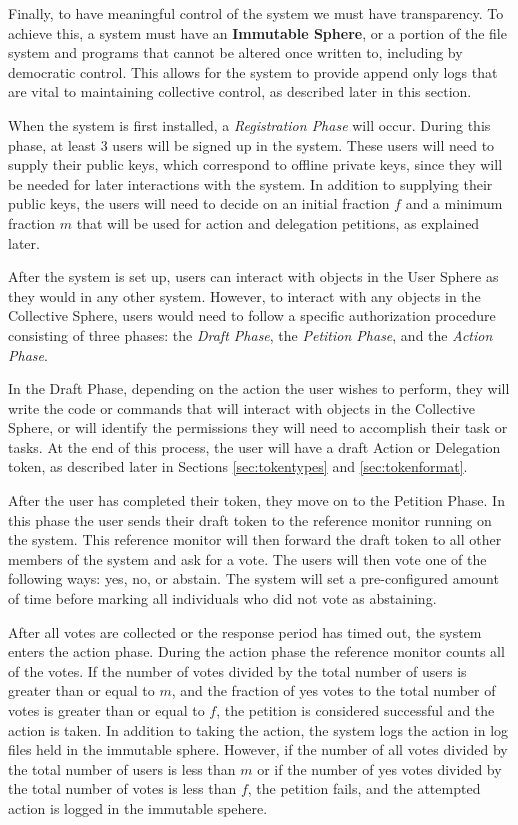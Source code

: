 Finally, to have meaningful control of the system we must have transparency. To
achieve this, a system must have an \textbf{Immutable Sphere}, or a portion of
the file system and programs that cannot be altered once written to, including
by democratic control. This allows for the system to provide append only logs
that are vital to maintaining collective control, as described later in this
section.

When the system is first installed, a \textit{Registration Phase} will occur.
During this phase, at least 3 users will be signed up in the system. These users
will need to supply their public keys, which correspond to offline private keys,
since they will be needed for later interactions with the system. In addition to
supplying their public keys, the users will need to decide on an initial
fraction $f$ and a minimum fraction $m$ that will be used for action and
delegation petitions, as explained later.

After the system is set up, users can interact with objects in the User Sphere
as they would in any other system. However, to interact with any objects in the
Collective Sphere, users would need to follow a specific authorization
procedure consisting of three phases: the \textit{Draft Phase}, the 
\textit{Petition Phase}, and the \textit{Action Phase}.

In the Draft Phase, depending on the action the user wishes to perform, they
will write the code or commands that will interact with objects in the
Collective Sphere, or will identify the permissions they will need to accomplish
their task or tasks. At the end of this process, the user will have a draft
Action or Delegation token, as described later in Sections \ref{sec:tokentypes}
and \ref{sec:tokenformat}.

After the user has completed their token, they move on to the Petition Phase. In
this phase the user sends their draft token to the reference monitor running on
the system. This reference monitor will then forward the draft token to all
other members of the system and ask for a vote. The users will then vote one of
the following ways: yes, no, or abstain. The system will set a pre-configured
amount of time before marking all individuals who did not vote as abstaining.

After all votes are collected or the response period has timed out, the system
enters the action phase. During the action phase the reference monitor counts
all of the votes. If the number of votes divided by the total number of users is
greater than or equal to $m$, and the fraction of yes votes to the total number
of votes is greater than or equal to $f$, the petition is considered successful
and the action is taken. In addition to taking the action, the system logs the
action in log files held in the immutable sphere. However, if the number of all
votes divided by the total number of users is less than $m$ or if the number of
yes votes divided by the total number of votes is less than $f$, the petition
fails, and the attempted action is logged in the immutable spehere.

